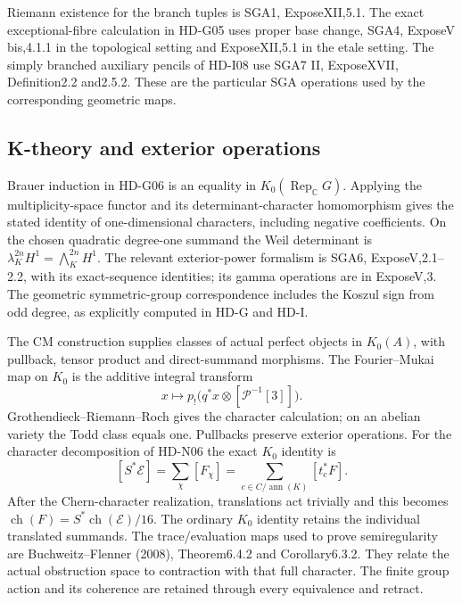 Riemann existence for the branch tuples is SGA1, ExposeXII,5.1.
The exact exceptional-fibre calculation in HD-G05 uses proper base
change, SGA4, ExposeV bis,4.1.1 in the topological setting and
ExposeXII,5.1 in the etale setting. The simply branched auxiliary
pencils of HD-I08 use SGA7 II, ExposeXVII, Definition2.2 and2.5.2.
These are the particular SGA operations used by the corresponding
geometric maps.

\subsection{K-theory and exterior operations}

Brauer induction in HD-G06 is an equality in
$K_0(\operatorname{Rep}_{\mathbb C}G)$. Applying the multiplicity-space
functor and its determinant-character homomorphism gives the stated
identity of one-dimensional characters, including negative coefficients.
On the chosen quadratic degree-one summand the Weil determinant is
$\lambda_K^{2n}H^1=\bigwedge_K^{2n}H^1$. The relevant exterior-power
formalism is SGA6, ExposeV,2.1--2.2, with its exact-sequence identities;
its gamma operations are in ExposeV,3. The geometric symmetric-group
correspondence includes the Koszul sign from odd degree, as explicitly
computed in HD-G and HD-I.

The CM construction supplies classes of actual perfect objects in
$K_0(A)$, with pullback, tensor product and direct-summand morphisms.
The Fourier--Mukai map on $K_0$ is the additive integral transform
\[
 x\longmapsto p_!\bigl(q^*x\otimes[\mathcal P^{-1}[3]]\bigr).
\]
Grothendieck--Riemann--Roch gives the character calculation; on an
abelian variety the Todd class equals one. Pullbacks preserve exterior
operations. For the character decomposition of HD-N06 the exact
$K_0$ identity is
\[
 [S^*\mathcal E]=\sum_\chi[F_\chi]
 =\sum_{c\in C/\operatorname{ann}(K)}[t_c^*F].
\]
After the Chern-character realization, translations act trivially and
this becomes $\operatorname{ch}(F)=S^*\operatorname{ch}(\mathcal E)/16$.
The ordinary $K_0$ identity retains the individual translated summands.
The trace/evaluation maps used to prove semiregularity are
Buchweitz--Flenner (2008), Theorem6.4.2 and Corollary6.3.2.
They relate the actual obstruction space to contraction with that
full character. The finite group action and its coherence are retained
through every equivalence and retract.

